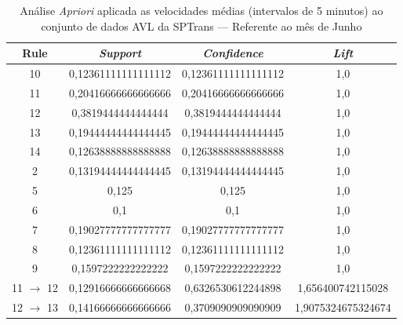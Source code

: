 \documentclass[
	12pt,				%
	oneside,			%
	a4paper,			%
	english,			%
	brazil				%
	]{abntex2ppgsi}
\begin{document}
{{\begin{apendicesenv}
\begin{table}[!htb]
\centering
\caption {Análise \textit{Apriori} aplicada as velocidades médias (intervalos de 5 minutos) ao conjunto de dados AVL da SPTrans --- Referente ao mês de Junho}
\label {tab:aprioriJune}
\begin{tabular}{c|c|c|c}
\hline
\textbf{Rule} & \textit{\textbf{Support}} & \textit{\textbf{Confidence}} & \textit{\textbf{Lift}} \\
\hline
10 &  0,12361111111111112 &  0,12361111111111112 &  1,0\\
\hline
11 &  0,20416666666666666 &  0,20416666666666666 &  1,0\\
\hline
12 &  0,3819444444444444 &  0,3819444444444444 &  1,0\\
\hline
13 &  0,19444444444444445 &  0,19444444444444445 &  1,0\\
\hline
14 &  0,12638888888888888 &  0,12638888888888888 &  1,0\\
\hline
2 &  0,13194444444444445 &  0,13194444444444445 &  1,0\\
\hline
5 &  0,125 &  0,125 &  1,0\\
\hline
6 &  0,1 &  0,1 &  1,0\\
\hline
7 &  0,19027777777777777 &  0,19027777777777777 &  1,0\\
\hline
8 &  0,12361111111111112 &  0,12361111111111112 &  1,0\\
\hline
9 &  0,1597222222222222 &  0,1597222222222222 &  1,0\\
\hline
11 $\rightarrow$ 12 &  0,12916666666666668 &  0,6326530612244898 &  1,656400742115028\\
\hline
12 $\rightarrow$ 13 &  0,14166666666666666 &  0,3709090909090909 &  1,9075324675324674\\
\hline
\end{tabular}
\end{table}


\end{apendicesenv}}}
\end{document}
